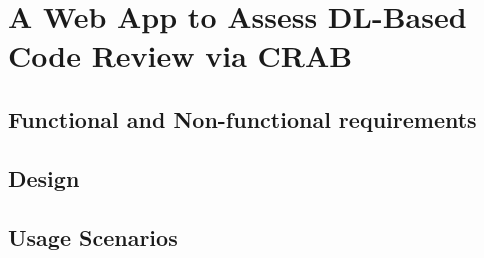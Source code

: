 \section{A Web App to Assess DL-Based Code Review via CRAB}

\subsection{Functional and Non-functional requirements}
\subsection{Design}


\subsection{Usage Scenarios}


